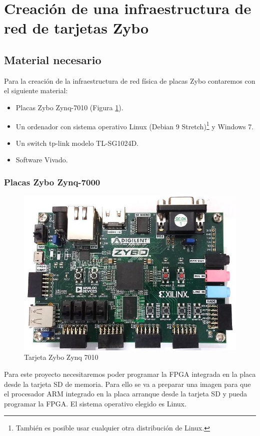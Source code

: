 \section{Creación de una infraestructura de red de tarjetas Zybo}
\hypertarget{CreacionInfraestructura}{}
\subsection{Material necesario}
Para la creación de la infraestructura de red física de placas Zybo contaremos con el siguiente material:
\begin{itemize}
	\item Placas Zybo Zynq-7010 (Figura \ref{Tarjeta Zybo}).
	\item Un ordenador con sistema operativo Linux (Debian 9 Stretch)\footnote{También es posible usar cualquier otra distribución de Linux.} y Windows 7.
	\item Un switch tp-link modelo TL-SG1024D.
	\item Software Vivado.
\end{itemize}

\subsubsection{Placas Zybo Zynq-7000}
\begin{figure}[h]
	\centering
	\includegraphics[scale=0.5]{Anexos/Anexo2/Infraestructura/zybo.jpg}
	\caption{Tarjeta Zybo Zynq 7010}
	\label{Tarjeta Zybo}
\end{figure}
Para este proyecto necesitaremos poder programar la FPGA integrada en la placa desde la tarjeta SD de memoria. Para ello se va a preparar una imagen para que el procesador ARM integrado en la placa arranque desde la tarjeta SD y pueda programar la FPGA. El sistema operativo elegido es Linux.

